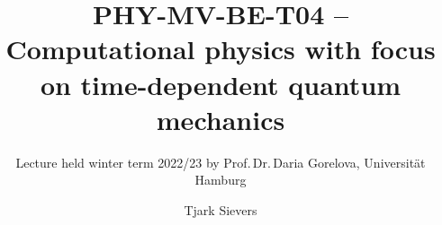 \documentclass[a4paper, twoside]{scrbook}
\begin{document}
\title{PHY-MV-BE-T04 -- Computational physics with focus on time-dependent quantum mechanics}
\author{Tjark Sievers}
\subtitle{Lecture held winter term 2022/23 by Prof.\,Dr.\,Daria Gorelova, Universität Hamburg}
\date{}
\maketitle
\end{document}
